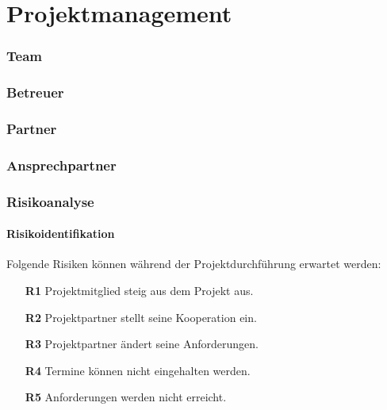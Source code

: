 \def \currentAuthor {Das Projektteam} %

\chapter{Projektmanagement}
\subsection{Team}
\subsection{Betreuer}
\subsection{Partner}
\subsection{Ansprechpartner}
\newpage

\subsection{Risikoanalyse}
\subsubsection{Risikoidentifikation}

Folgende Risiken können während der Projektdurchführung erwartet werden:
\begin{itemize}
	\item[\textbf{R1}] Projektmitglied steig aus dem Projekt aus.
	\item[\textbf{R2}] Projektpartner stellt seine Kooperation ein.
	\item[\textbf{R3}] Projektpartner ändert seine Anforderungen.
	\item[\textbf{R4}] Termine können nicht eingehalten werden.
	\item[\textbf{R5}] Anforderungen werden nicht erreicht.
\end{itemize}

